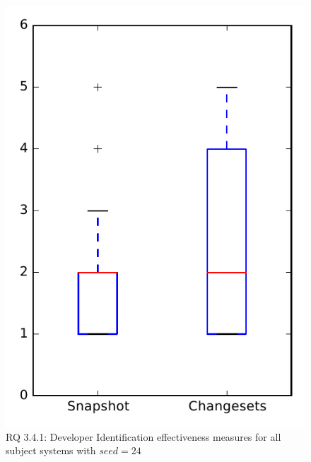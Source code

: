 
\begin{figure}
\centering
\includegraphics[height=0.4\textheight]{figures/dit_seed/rq1_overview_24}
\caption{RQ 3.4.1: Developer Identification effectiveness measures for all subject systems with $seed=24$}
\label{fig:dit_seed:rq1:overview}
\end{figure}

